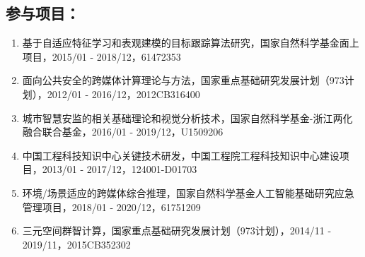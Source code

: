 \begin{publications}
\section*{参与项目：}
\begin{enumerate}
\item{基于自适应特征学习和表观建模的目标跟踪算法研究，国家自然科学基金面上项目，2015/01 - 2018/12，61472353}
\item{面向公共安全的跨媒体计算理论与方法，国家重点基础研究发展计划（973计划），2012/01 - 2016/12，2012CB316400}
\item{城市智慧安监的相关基础理论和视觉分析技术，国家自然科学基金-浙江两化融合联合基金，2016/01 - 2019/12，U1509206}
\item{中国工程科技知识中心关键技术研发，中国工程院工程科技知识中心建设项目，2013/01 - 2017/12，124001-D01703}
\item{环境/场景适应的跨媒体综合推理，国家自然科学基金人工智能基础研究应急管理项目，2018/01 - 2020/12，61751209}
\item{三元空间群智计算，国家重点基础研究发展计划（973计划），2014/11 - 2019/11，2015CB352302}
\end{enumerate}

\end{publications}

